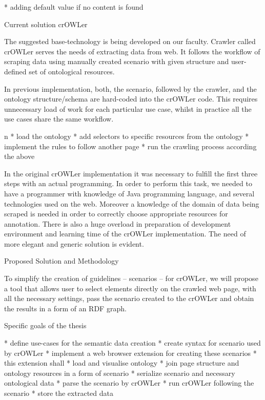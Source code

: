 \begitems
  * adding default value if no content is found
\enditems


\sec Current solution crOWLer

The suggested base-technology is being developed on our faculty. Crawler called
crOWLer serves the needs of extracting data from web. It follows the workflow
of scraping data using manually created scenario with given structure and
user-defined set of ontological resources. 

In previous implementation, both, the scenario, followed by the crawler, and
the ontology structure/schema are hard-coded into the crOWLer code. This
requires unnecessary load of work for each particular use case, whilst in
practice all the use cases share the same workflow. 

\begitems \style n
  * load the ontology
  * add selectors to specific resources from the ontology
  * implement the rules to follow another page
  * run the crawling process according the above
\enditems

In the original crOWLer implementation it was necessary to fulfill the first
three steps with an actual programming. In order to perform this task, we needed
to have a programmer with knowledge of Java programming language, and several
technologies used on the web. Moreover a knowledge of the domain of data being
scraped is needed in order to correctly choose appropriate resources for
annotation. There is also a huge overload in preparation of development
environment and learning time of the crOWLer implementation. The need of more
elegant and generic solution is evident. 


\sec Proposed Solution and Methodology

To simplify the creation of guidelines -- scenarios -- for crOWLer, we will propose a
tool that allows user to select elements directly on the crawled web page, with
all the necessary settings, pass the scenario created to the crOWLer and obtain
the results in a form of an RDF graph. 


\sec Specific goals of the thesis

\begitems
  * define use-cases for the semantic data creation 
  * create syntax for scenario used by crOWLer 
  * implement a web browser extension for creating these scenarios
  * this extension shall
  \begitems
    * load and visualise ontology 
    * join page structure and ontology resources in a form of scenario
    * serialize scenario and necessary ontological data
  \enditems
  * parse the scenario by crOWLer
  * run crOWLer following the scenario
  * store the extracted data
\enditems


